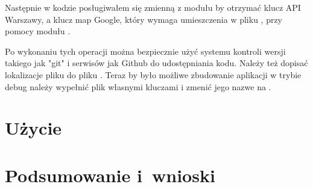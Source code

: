 \documentclass{SGGW-thesis}
\begin{document}
Następnie w kodzie posługiwałem się zmienną  z modułu  by otrzymać klucz API Warszawy,
a klucz map Google, który wymaga umieszczenia w pliku , przy pomocy modułu .

Po wykonaniu tych operacji można bezpiecznie użyć systemu kontroli wersji takiego jak "git" i serwisów jak Github do udostępniania kodu.
Należy też dopisać lokalizacje pliku  do pliku .
Teraz by było możliwe zbudowanie aplikacji w trybie debug należy wypełnić plik  własnymi kluczami i zmenić jego nazwe na .

\chapter{Użycie}


\chapter{Podsumowanie i~wnioski}


\begin{thebibliography}{9}

\end{thebibliography}

\beforelastpage
\end{document}
